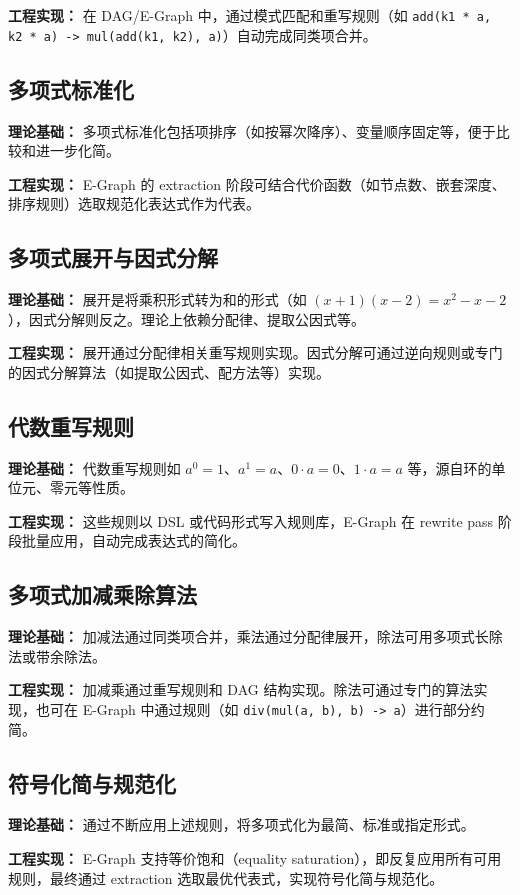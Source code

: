 \documentclass[12pt,openany]{book}
\begin{document}
  	\textbf{工程实现：} 在 DAG/E-Graph 中，通过模式匹配和重写规则（如 \texttt{add(k1 * a, k2 * a) -> mul(add(k1, k2), a)}）自动完成同类项合并。

\subsection{多项式标准化}
  	\textbf{理论基础：} 多项式标准化包括项排序（如按幂次降序）、变量顺序固定等，便于比较和进一步化简。

  	\textbf{工程实现：} E-Graph 的 extraction 阶段可结合代价函数（如节点数、嵌套深度、排序规则）选取规范化表达式作为代表。

\subsection{多项式展开与因式分解}
  	\textbf{理论基础：} 展开是将乘积形式转为和的形式（如 $(x+1)(x-2)=x^2-x-2$），因式分解则反之。理论上依赖分配律、提取公因式等。

  	\textbf{工程实现：} 展开通过分配律相关重写规则实现。因式分解可通过逆向规则或专门的因式分解算法（如提取公因式、配方法等）实现。

\subsection{代数重写规则}
  	\textbf{理论基础：} 代数重写规则如 $a^0=1$、$a^1=a$、$0\cdot a=0$、$1\cdot a=a$ 等，源自环的单位元、零元等性质。

  	\textbf{工程实现：} 这些规则以 DSL 或代码形式写入规则库，E-Graph 在 rewrite pass 阶段批量应用，自动完成表达式的简化。

\subsection{多项式加减乘除算法}
  	\textbf{理论基础：} 加减法通过同类项合并，乘法通过分配律展开，除法可用多项式长除法或带余除法。

  	\textbf{工程实现：} 加减乘通过重写规则和 DAG 结构实现。除法可通过专门的算法实现，也可在 E-Graph 中通过规则（如 \texttt{div(mul(a, b), b) -> a}）进行部分约简。

\subsection{符号化简与规范化}
  	\textbf{理论基础：} 通过不断应用上述规则，将多项式化为最简、标准或指定形式。

  	\textbf{工程实现：} E-Graph 支持等价饱和（equality saturation），即反复应用所有可用规则，最终通过 extraction 选取最优代表式，实现符号化简与规范化。
\end{document}
